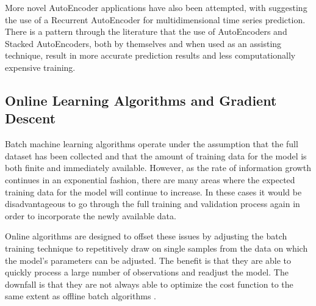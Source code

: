 \documentclass[a4paper,11pt,oneside]{article}
\theoremstyle{plain}
\theoremstyle{definition}
\begin{document}
	More novel AutoEncoder applications have also been attempted, with \citet{Hsu} suggesting the use of a 
	Recurrent AutoEncoder for multidimensional time series prediction. There is a pattern through the literature 
	that the use of AutoEncoders and Stacked AutoEncoders, both by themselves and when used as an assisting technique, result in more accurate 
	prediction results and less computationally expensive training.
	
	\subsection{Online Learning Algorithms and Gradient Descent} \label{lr_OGD}
	\hfill
	
	Batch machine learning algorithms operate under the assumption that the 
	full dataset has been collected and that the amount of training data for the model is both finite and immediately 
	available. However, as the rate of information growth continues in an exponential fashion, there are many areas where
	the expected training data for the model will continue to increase. In these cases it would be disadvantageous to go 
	through the full training and validation process again in order to incorporate the newly available data.
	\hfill\break
	
	Online algorithms are designed to offset these issues by adjusting the batch training technique to 
	repetitively draw on single samples from the data on which the model's parameters can be adjusted. The benefit 
	is that they are able to quickly process a large number of observations and readjust the model. The 
	downfall is that they are not always able to optimize the cost function to the same extent as offline batch 
	algorithms \citep{Albers}.
	\hfill\break
	
\end{document}
